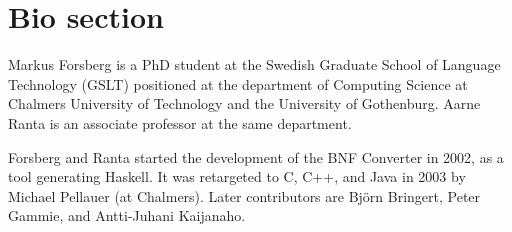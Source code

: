 \documentclass{sig-alt}
\begin{document}
\section{Bio section}

Markus Forsberg is a PhD student at the Swedish Graduate School of Language
Technology (GSLT) positioned at the department of Computing Science at Chalmers University of
Technology and the University of Gothenburg. Aarne Ranta is an
associate professor at the same department.

Forsberg and Ranta started the development of the BNF Converter in
2002, as a tool generating Haskell. It was retargeted to C, C++, and
Java in 2003 by Michael Pellauer (at Chalmers). Later contributors 
are Bj\"orn Bringert, Peter Gammie, and Antti-Juhani Kaijanaho.




\end{document}

